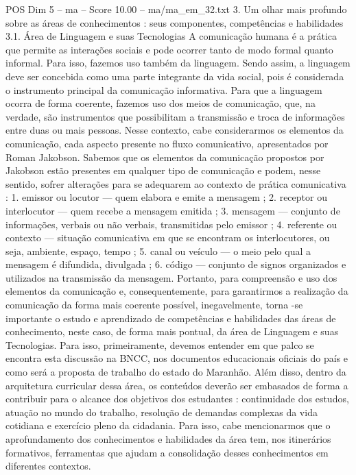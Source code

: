 \begin{textsample}{POS Dim 5 – ma – Score 10.00 – ma/ma\_em\_32.txt}  \label{ex:f5_pos_171}
3.
Um olhar mais profundo sobre as áreas de conhecimentos : seus componentes, competências e habilidades 3.1.
Área de Linguagem e suas Tecnologias A comunicação humana é a prática que permite as interações sociais e pode ocorrer tanto de modo formal quanto informal.
Para isso, fazemos uso também da linguagem.
Sendo assim, a linguagem deve ser concebida como uma parte integrante da vida social, pois é considerada o instrumento principal da comunicação informativa.
Para que a linguagem ocorra de forma coerente, fazemos uso dos meios de comunicação, que, na verdade, são instrumentos que possibilitam a transmissão e troca de informações entre duas ou mais pessoas.
Nesse contexto, cabe considerarmos os elementos da comunicação, cada aspecto presente no fluxo comunicativo, apresentados por Roman Jakobson.
Sabemos que os elementos da comunicação propostos por Jakobson estão presentes em qualquer tipo de comunicação e podem, nesse sentido, sofrer alterações para se adequarem ao contexto de prática comunicativa : 1. emissor ou locutor — quem elabora e emite a mensagem ; 2. receptor ou interlocutor — quem recebe a mensagem emitida ; 3. mensagem — conjunto de informações, verbais ou não verbais, transmitidas pelo emissor ; 4. referente ou contexto — situação comunicativa em que se encontram os interlocutores, ou seja, ambiente, espaço, tempo ; 5. canal ou veículo — o meio pelo qual a mensagem é difundida, divulgada ; 6. código — conjunto de signos organizados e utilizados na transmissão da mensagem.
Portanto, para compreensão e uso dos elementos da comunicação e, consequentemente, para garantirmos a realização da comunicação da forma mais coerente possível, inegavelmente, torna -se importante o estudo e aprendizado de competências e habilidades das áreas de conhecimento, neste caso, de forma mais pontual, da área de Linguagem e suas Tecnologias.
Para isso, primeiramente, devemos entender em que palco se encontra esta discussão na BNCC, nos documentos educacionais oficiais do país e como será a proposta de trabalho do estado do Maranhão.
Além disso, dentro da arquitetura curricular dessa área, os conteúdos deverão ser embasados de forma a contribuir para o alcance dos objetivos dos estudantes : continuidade dos estudos, atuação no mundo do trabalho, resolução de demandas complexas da vida cotidiana e exercício pleno da cidadania.
Para isso, cabe mencionarmos que o aprofundamento dos conhecimentos e habilidades da área tem, nos itinerários formativos, ferramentas que ajudam a consolidação desses conhecimentos em diferentes contextos.

\end{textsample}
